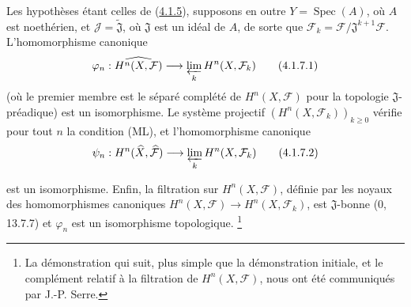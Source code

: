 \begin{corollary}[4.1.7]
\label{III.4.1.7-fr}
Les hypothèses étant celles de (\hyperref[III.4.1.5-fr]{4.1.5}), supposons
en outre $Y=\operatorname{Spec}(A)$, où $A$ est noethérien, et
$\mathcal J=\widetilde{\mathfrak J}$, où $\mathfrak J$ est un idéal de
$A$, de sorte que
$\mathcal F_k=\mathcal F/\mathfrak J^{k+1}\mathcal F$.
L'homomorphisme canonique
\[
\varphi_n:\widehat{H^n(X,\mathcal F)}
\longrightarrow\varprojlim_kH^n(X,\mathcal F_k)
\tag{4.1.7.1}\label{III.4.1.7.1-fr}
\]
(où le premier membre est le séparé complété de $H^n(X,\mathcal F)$ pour
la topologie $\mathfrak J$-préadique) est un isomorphisme. Le système
projectif $(H^n(X,\mathcal F_k))_{k\geq0}$ vérifie pour tout $n$ la
condition (ML), et l'homomorphisme canonique
\[
\psi_n:H^n(\widehat X,\widehat{\mathcal F})
\longrightarrow\varprojlim_kH^n(X,\mathcal F_k)
\tag{4.1.7.2}\label{III.4.1.7.2-fr}
\]


est un isomorphisme. Enfin, la filtration sur $H^n(X,\mathcal F)$, définie
par les noyaux des homomorphismes canoniques
$H^n(X,\mathcal F)\to H^n(X,\mathcal F_k)$, est $\mathfrak J$-bonne
(0, 13.7.7) et $\varphi_n$ est un isomorphisme topologique.
\footnote{La démonstration qui suit, plus simple que la démonstration
initiale, et le complément relatif à la filtration de
$H^n(X,\mathcal F)$, nous ont été communiqués par J.-P. Serre.}
\end{corollary}


